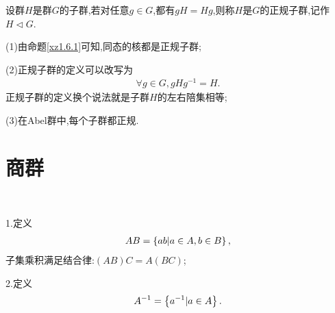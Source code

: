 \begin{definition}[正规子群]\label{sadjfgnka}
    设群$H$是群$G$的子群,若对任意$g\in G$,都有$gH=Hg$,则称$H$是$G$的正规子群,记作$H\lhd G$.
\end{definition}
\begin{remark}
    (1)由命题\ref{xz1.6.1}可知,同态的核都是正规子群;

    (2)正规子群的定义可以改写为\begin{align*}
        \forall g\in G,gHg^{-1}=H.
    \end{align*}正规子群的定义换个说法就是子群$H$的左右陪集相等;

    (3)在Abel群中,每个子群都正规.
\end{remark}
\section{商群}
\begin{definition}[群的子集合的运算]
    \ 

    1.定义\begin{align*}
        AB=\left\{ab|a\in A,b\in B\right\},
    \end{align*}子集乘积满足结合律:$(AB)C=A(BC)$;

    2.定义\begin{align*}
        A^{-1}=\left\{a^{-1}|a\in A\right\}.
    \end{align*}
\end{definition}

